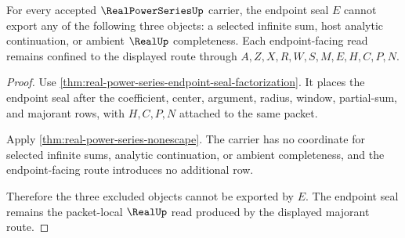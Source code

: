 \begin{theorem}\label{thm:realpowerseries-endpoint-nonescape-triad}
For every accepted $\RealPowerSeriesUp$ carrier, the endpoint seal $E$ cannot export any of the following three objects: a selected infinite sum, host analytic continuation, or ambient $\RealUp$ completeness. Each endpoint-facing read remains confined to the displayed route through $A,Z,X,R,W,S,M,E,H,C,P,N$.
\end{theorem}
\begin{proof}
Use \autoref{thm:real-power-series-endpoint-seal-factorization}. It places the endpoint seal after the coefficient, center, argument, radius, window, partial-sum, and majorant rows, with $H,C,P,N$ attached to the same packet.

Apply \autoref{thm:real-power-series-nonescape}. The carrier has no coordinate for selected infinite sums, analytic continuation, or ambient completeness, and the endpoint-facing route introduces no additional row.

Therefore the three excluded objects cannot be exported by $E$. The endpoint seal remains the packet-local $\RealUp$ read produced by the displayed majorant route.
\end{proof}

